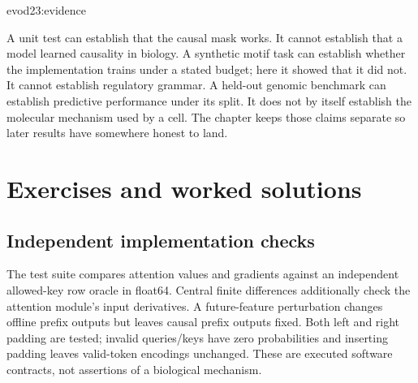 {evod23:evidence}

A unit test can establish that the causal mask works. It cannot establish that a
model learned causality in biology. A synthetic motif task can establish whether the
implementation trains under a stated budget; here it showed that it did not. It cannot
establish regulatory grammar. A held-out genomic
benchmark can establish predictive performance under its split. It does not by
itself establish the molecular mechanism used by a cell. The chapter keeps those
claims separate so later results have somewhere honest to land.

\section{Exercises and worked solutions}
\subsection*{Independent implementation checks}
The test suite compares attention values and gradients against an independent
allowed-key row oracle in float64. Central finite differences additionally check
the attention module's input derivatives. A future-feature perturbation changes
offline prefix outputs but leaves causal prefix outputs fixed. Both left and right
padding are tested; invalid queries/keys have zero probabilities and inserting
padding leaves valid-token encodings unchanged. These are executed software
contracts, not assertions of a biological mechanism.

